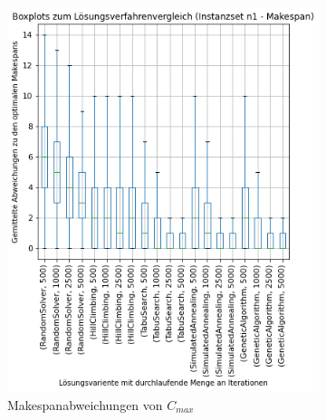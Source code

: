 \begin{figure}[H]

    \begin{subfigure}{0.497\linewidth}
        \centering
        \includegraphics[width=\linewidth]{assets/img/05_Evaluation/Boxplot_n1_Makespan.png}
        \caption{Makespanabweichungen von $C_{max}$}
        \label{fig:evaluation_solver_n1_makespan_boxplot}
    \end{subfigure}
    \hfill
    \begin{subfigure}{0.497\linewidth}
        \centering

\end{subfigure}
\end{figure}

